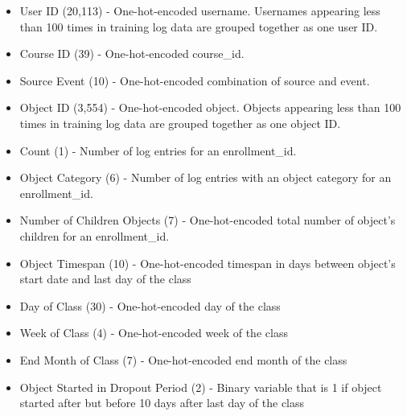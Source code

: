 \begin{itemize}
  \setlength\itemsep{0em}
  \item User ID (20,113) - One-hot-encoded username. Usernames appearing less than 100 times in training log data are grouped together as one user ID. 
  \item Course ID (39) - One-hot-encoded course\_id.
  \item Source Event (10) - One-hot-encoded combination of source and event.
  \item Object ID (3,554) - One-hot-encoded object.  Objects appearing less than 100 times in training log data are grouped together as one object ID.
  \item Count (1) - Number of log entries for an enrollment\_id.
  \item Object Category (6) - Number of log entries with an object category for an enrollment\_id.
  \item Number of Children Objects (7) - One-hot-encoded total number of object's children for an enrollment\_id.
  \item Object Timespan (10) - One-hot-encoded timespan in days between object's start date and last day of the class
  \item Day of Class (30) - One-hot-encoded day of the class
  \item Week of Class (4) - One-hot-encoded week of the class
  \item End Month of Class (7) - One-hot-encoded end month of the class
  \item Object Started in Dropout Period (2) - Binary variable that is 1 if object started after but before 10 days after last day of the class
\end{itemize}
